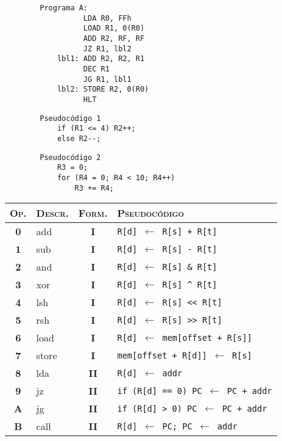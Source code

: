 \documentclass[12pt,a4paper]{article}
\begin{document}
\begin{small}
	\begin{minipage}{.4\textwidth}
		\begin{verbatim}
		Programa A:
			      LDA R0, FFh
			      LOAD R1, 0(R0)
			      ADD R2, RF, RF
			      JZ R1, lbl2
			lbl1: ADD R2, R2, R1
			      DEC R1
			      JG R1, lbl1
			lbl2: STORE R2, 0(R0)
			      HLT
		\end{verbatim}
		\begin{verbatim}
		Pseudocódigo 1
		    if (R1 <= 4) R2++;
		    else R2--;
		\end{verbatim}
		\begin{verbatim}
		Pseudocódigo 2
		    R3 = 0;
		    for (R4 = 0; R4 < 10; R4++)
		        R3 += R4;
		\end{verbatim}
	\end{minipage}
	\begin{minipage}{.6\textwidth}	
		\begin{tabular}{|c|l|c|l|}\hline
			\textsc{Op.} & \textsc{Descr.} & \textsc{Form.} & \textsc{Pseudocódigo} \\ \hline
			\textbf{0} & \textsf{add} & \textbf{I} & \texttt{R[d] $\leftarrow$ R[s] + R[t]} \\
			\textbf{1} & \textsf{sub} & \textbf{I} & \texttt{R[d] $\leftarrow$ R[s] - R[t]} \\
			\textbf{2} & \textsf{and} & \textbf{I} & \texttt{R[d] $\leftarrow$ R[s] \& R[t]} \\
			\textbf{3} & \textsf{xor} & \textbf{I} & \texttt{R[d] $\leftarrow$ R[s] \^{} R[t]} \\
			\textbf{4} & \textsf{lsh} & \textbf{I} & \texttt{R[d] $\leftarrow$ R[s] <{}<{} R[t]} \\
			\textbf{5} & \textsf{rsh}  & \textbf{I} & \texttt{R[d] $\leftarrow$ R[s] >{}>{} R[t]} \\
			\textbf{6} & \textsf{load}  & \textbf{I} & \texttt{R[d] $\leftarrow$ mem[offset + R[s]]} \\
			\textbf{7} & \textsf{store} & \textbf{I} & \texttt{mem[offset + R[d]] $\leftarrow$ R[s]} \\
			\textbf{8} & \textsf{lda}   & \textbf{II} & \texttt{R[d] $\leftarrow$ addr} \\
			\textbf{9} & \textsf{jz}    & \textbf{II} & \texttt{if (R[d] == 0) PC $\leftarrow$ PC + addr} \\
			\textbf{A} & \textsf{jg}    & \textbf{II} & \texttt{if (R[d] >{} 0) PC $\leftarrow$ PC + addr} \\
			\textbf{B} & \textsf{call}  & \textbf{II} & \texttt{R[d] $\leftarrow$ PC; PC $\leftarrow$ addr} \\

\end{tabular}
\end{minipage}
\end{small}
\end{document}
